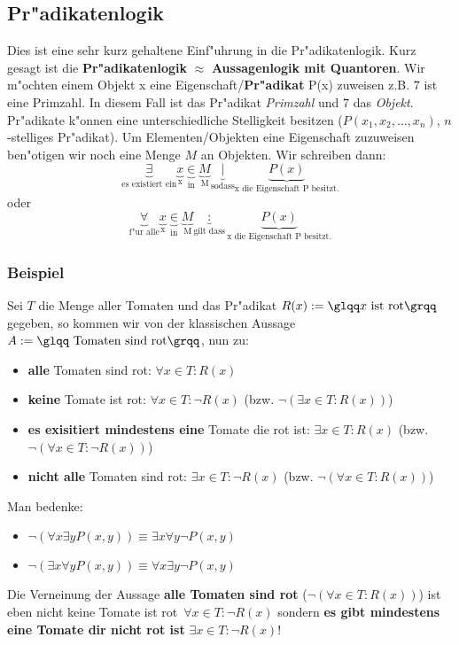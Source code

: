 \subsection{Pr"adikatenlogik}
Dies ist eine sehr kurz gehaltene Einf"uhrung in die Pr"adikatenlogik. Kurz gesagt ist die \textbf{Pr"adikatenlogik} \textbf{$\approx$} \textbf{Aussagenlogik mit Quantoren}. Wir m"ochten einem Objekt x eine Eigenschaft/\textbf{Pr"adikat} P(x) zuweisen z.B. \glqq$7$ ist eine Primzahl\grqq . In diesem Fall ist das Pr"adikat \textit{Primzahl} und $7$ das \textit{Objekt}.\\
Pr"adikate k"onnen eine unterschiedliche Stelligkeit besitzen ($P(x_1, x_2, \ldots, x_n)$, $n$-stelliges Pr"adikat). Um Elementen/Objekten eine Eigenschaft zuzuweisen ben"otigen wir noch eine Menge $M$ an Objekten. Wir schreiben dann:
\begin{equation*}
\underbrace{\exists}_{\text{es existiert ein}} \underbrace{x}_{\text{x}} \underbrace{\in}_{\text{in}} \underbrace{M}_{\text{M}} \underbrace{|}_{\text{sodass}} \underbrace{P(x)}_{\text{x die Eigenschaft P besitzt.}}
\end{equation*}
oder
\begin{equation*}
\underbrace{\forall}_{\text{f"ur alle}} \underbrace{x}_{\text{x}} \underbrace{\in}_{\text{in}} \underbrace{M}_{\text{M}} \underbrace{:}_{\text{gilt dass}} \underbrace{P(x)}_{\text{x die Eigenschaft P besitzt.}}
\end{equation*}

\subsubsection*{Beispiel}
Sei $T$ die Menge aller Tomaten und das Pr"adikat $R(x):= \text{\glqq}x \text{ ist rot\grqq}$ gegeben, so kommen wir von der klassischen Aussage $A := \text{\glqq Tomaten sind rot\grqq}$, nun zu:
\begin{itemize}
\item \glqq\textbf{alle} Tomaten sind rot\grqq : $\forall x \in T : R(x)$
\item \glqq\textbf{keine} Tomate ist rot\grqq : $\forall x \in T : \neg R(x)$ (bzw. $\neg (\exists x \in T : R(x))$)
\item \glqq\textbf{es exisitiert mindestens eine} Tomate die rot ist\grqq : $\exists x \in T : R(x)$ (bzw. $\neg (\forall x \in T : \neg R(x))$)
\item \glqq\textbf{nicht alle} Tomaten sind rot\grqq : $\exists x \in T : \neg R(x)$ (bzw. $\neg (\forall x \in T : R(x))$)
\end{itemize}
Man bedenke:
\begin{itemize}
\item $ \neg (\forall x \exists y P(x, y)) \equiv \exists x \forall y \neg P(x, y)$
\item $ \neg (\exists x \forall y P(x, y)) \equiv \forall x \exists y \neg P(x, y)$
\end{itemize}
Die Verneinung der Aussage \textbf{\glqq alle Tomaten sind rot\grqq} ($\neg (\forall x \in T : R(x))$) ist eben nicht \glqq keine Tomate ist rot\grqq \ $\forall x \in T : \neg R(x)$ sondern \textbf{\glqq es gibt mindestens eine Tomate dir nicht rot ist\grqq} $ \exists x \in T : \neg R(x)$!

